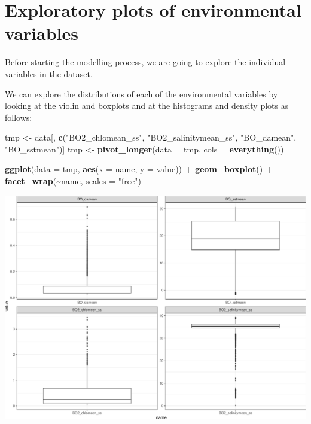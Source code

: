 \documentclass[
]{book}
\newenvironment{Shaded}{\begin{snugshade}}{\end{snugshade}}
\newcommand{\AttributeTok}[1]{\textcolor[rgb]{0.13,0.29,0.53}{#1}}
\newcommand{\FunctionTok}[1]{\textcolor[rgb]{0.13,0.29,0.53}{\textbf{#1}}}
\newcommand{\NormalTok}[1]{#1}
\newcommand{\OtherTok}[1]{\textcolor[rgb]{0.56,0.35,0.01}{#1}}
\newcommand{\SpecialCharTok}[1]{\textcolor[rgb]{0.81,0.36,0.00}{\textbf{#1}}}
\newcommand{\StringTok}[1]{\textcolor[rgb]{0.31,0.60,0.02}{#1}}
\begin{document}
\section{Exploratory plots of environmental variables}\label{exploratory-plots-of-environmental-variables}

Before starting the modelling process, we are going to explore the individual variables in the dataset.

We can explore the distributions of each of the environmental variables by looking at the violin and boxplots and at the histograms and density plots as follows:

\begin{Shaded}
\begin{Highlighting}[]
\NormalTok{tmp }\OtherTok{\textless{}{-}}\NormalTok{ data[, }\FunctionTok{c}\NormalTok{(}\StringTok{"BO2\_chlomean\_ss"}\NormalTok{, }\StringTok{"BO2\_salinitymean\_ss"}\NormalTok{,}
    \StringTok{"BO\_damean"}\NormalTok{, }\StringTok{"BO\_sstmean"}\NormalTok{)]}
\NormalTok{tmp }\OtherTok{\textless{}{-}} \FunctionTok{pivot\_longer}\NormalTok{(}\AttributeTok{data =}\NormalTok{ tmp, }\AttributeTok{cols =} \FunctionTok{everything}\NormalTok{())}

\FunctionTok{ggplot}\NormalTok{(}\AttributeTok{data =}\NormalTok{ tmp, }\FunctionTok{aes}\NormalTok{(}\AttributeTok{x =}\NormalTok{ name, }\AttributeTok{y =}\NormalTok{ value)) }\SpecialCharTok{+}
    \FunctionTok{geom\_boxplot}\NormalTok{() }\SpecialCharTok{+} \FunctionTok{facet\_wrap}\NormalTok{(}\SpecialCharTok{\textasciitilde{}}\NormalTok{name, }\AttributeTok{scales =} \StringTok{"free"}\NormalTok{)}
\end{Highlighting}
\end{Shaded}

\includegraphics{_main_files/figure-latex/unnamed-chunk-49-1.pdf}
\end{document}
